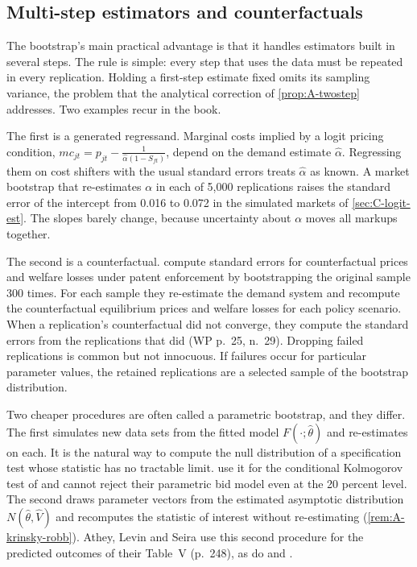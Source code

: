 \subsection{Multi-step estimators and counterfactuals}\label{sec:A-boot-multistep}

The bootstrap's main practical advantage is that it handles estimators built in several steps. The rule is simple:
every step that uses the data must be repeated in every replication. Holding a first-step estimate fixed omits its
sampling variance, the problem that the analytical correction of \cref{prop:A-twostep} addresses. Two examples
recur in the book.

The first is a generated regressand. Marginal costs implied by a logit pricing condition, $mc_{jt} = p_{jt} -
\frac{1}{\hat\alpha(1 - S_{ft})}$, depend on the demand estimate $\hat\alpha$. Regressing them on cost shifters with
the usual standard errors treats $\hat\alpha$ as known. A market bootstrap that re-estimates $\alpha$ in each of 5,000
replications raises the standard error of the intercept from 0.016 to 0.072 in the simulated markets of
\cref{sec:C-logit-est}. The slopes barely change, because uncertainty about $\alpha$ moves all markups together.

The second is a counterfactual. \citet[WP p.~25]{ChaudhuriGoldbergJia2006} compute standard errors for counterfactual
prices and welfare losses under patent enforcement by bootstrapping the original sample 300 times. For each sample
they re-estimate the demand system and recompute the counterfactual equilibrium prices and welfare losses for each
policy scenario. When a replication's counterfactual did not converge, they compute the standard errors from the
replications that did (WP p.~25, n.~29). Dropping failed replications is common but not innocuous. If failures
occur for particular parameter values, the retained replications are a selected sample of the bootstrap distribution.

Two cheaper procedures are often called a parametric bootstrap, and they differ. The first simulates new data sets
from the fitted model $F(\cdot;\hat\theta)$ and re-estimates on each. It is the natural way to compute the null
distribution of a specification test whose statistic has no tractable limit. \citet[p.~241]{AtheyLevinSeira2011}
use it for the conditional Kolmogorov test of \citet{Andrews1997} and cannot reject their parametric bid model even at
the 20 percent level. The second draws parameter vectors from the estimated asymptotic distribution
$N(\hat\theta, \hat V)$ and recomputes the statistic of interest without re-estimating
(\cref{rem:A-krinsky-robb}). Athey, Levin and Seira use this second procedure for the predicted outcomes of their
Table~V (p.~248), as do \citet{Nevo2001} and \citet{Gentzkow2007}.

